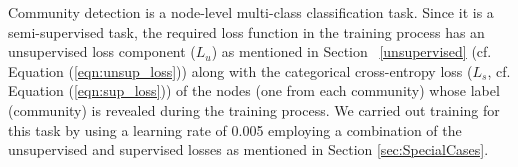 
Community detection is a node-level multi-class classification task. Since it is a semi-supervised task, the required loss function in the training process has an unsupervised loss component ($L_u$) as mentioned in Section ~\ref{unsupervised} (cf. Equation (\ref{eqn:unsup_loss})) along with the categorical cross-entropy loss ($L_s$, cf. Equation (\ref{eqn:sup_loss})) of the nodes (one from each community) whose label (community) is revealed during the training process. We carried out training for this task by using a learning rate of 0.005 employing a combination of the unsupervised and supervised losses as mentioned in Section \ref{sec:SpecialCases}.




% 



